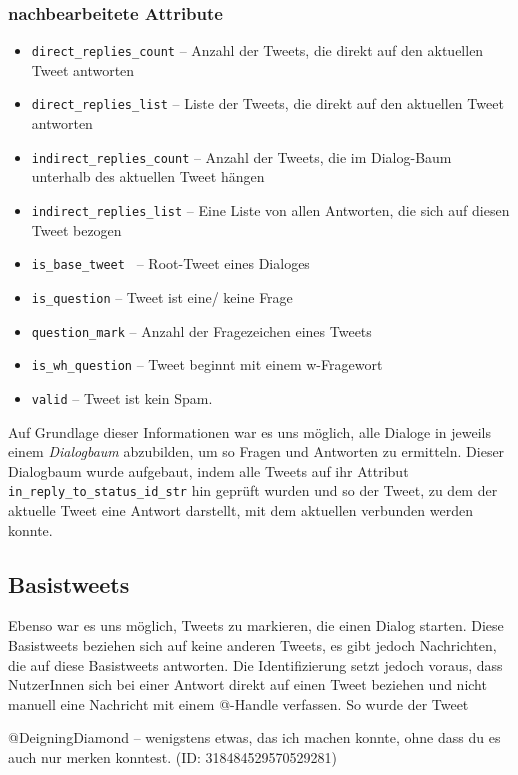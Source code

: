 \documentclass[main.tex]{subfiles}
\begin{document}
\subsubsection*{nachbearbeitete Attribute}
\begin{itemize}
\item \texttt{direct\_replies\_count} -- Anzahl der Tweets, die direkt auf den aktuellen Tweet antworten
\item \texttt{direct\_replies\_list} -- Liste der Tweets, die direkt auf den aktuellen Tweet antworten
\item \texttt{indirect\_replies\_count} -- Anzahl der Tweets, die im Dialog-Baum unterhalb des aktuellen Tweet hängen
\item \texttt{indirect\_replies\_list} -- Eine Liste von allen Antworten, die sich auf diesen Tweet bezogen
\item \texttt{is\_base\_tweet } -- Root-Tweet eines Dialoges
\item \texttt{is\_question} -- Tweet ist eine/ keine Frage
\item \texttt{question\_mark} -- Anzahl der Fragezeichen eines Tweets
\item \texttt{is\_wh\_question} -- Tweet beginnt mit einem w-Fragewort
\item \texttt{valid} -- Tweet ist kein Spam. 
\end{itemize}

Auf Grundlage dieser Informationen war es uns möglich, alle Dialoge in jeweils einem \textit{Dialogbaum} abzubilden, um so Fragen und Antworten zu ermitteln. Dieser Dialogbaum wurde aufgebaut, indem alle Tweets auf ihr Attribut \texttt{in\_reply\_to\_status\_id\_str} hin geprüft wurden und so der Tweet, zu dem der aktuelle Tweet eine Antwort darstellt, mit dem aktuellen verbunden werden konnte.

\subsection{Basistweets}
Ebenso war es uns möglich, Tweets zu markieren, die einen Dialog starten. Diese Basistweets beziehen sich auf keine anderen Tweets, es gibt jedoch Nachrichten, die auf diese Basistweets antworten. Die Identifizierung setzt jedoch voraus, dass NutzerInnen sich bei einer Antwort direkt auf einen Tweet beziehen und nicht manuell eine Nachricht mit einem @-Handle verfassen. So wurde der Tweet 
\begin{example}
@DeigningDiamond -- wenigstens etwas, das ich machen konnte, ohne dass du es auch nur merken konntest. (ID: 318484529570529281)
\end{example}
\end{document}

